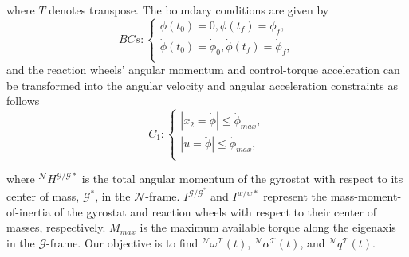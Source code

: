 \documentclass[letterpaper, paper,12pt]{AAS}		%
\begin{document}
	where $T$ denotes transpose. The boundary conditions are given by
	\begin{equation}\label{Bcs}
	BCs:\left\{
	\begin{array}{l}
	\phi(t_0)=0, \phi(t_f)=\phi_{f},\\
	\dot{\phi}(t_0)=\dot{\phi}_{0},\dot{ \phi}(t_f)=\dot{\phi}_{f}, \\
	\end{array}
	\right.
	\end{equation}
	and the reaction wheels' angular momentum and control-torque acceleration can be transformed into the angular velocity and angular acceleration constraints as follows
	\begin{equation}\label{constraints1}
	C_1:\left\{
	\begin{array}{l}
	|x_2=\dot{\phi}|\leq \dot{\phi}_{max},\\
	|u=\ddot{\phi}|\leq \ddot{\phi}_{max},\\
	\end{array}
	\right.
	\end{equation}
	
	
	
where $^\mathcal{N}H^{\mathcal{G/G*}}$ is the total angular momentum of the gyrostat with respect to its center of mass, $\mathcal{G}^*$, in the $\mathcal{N}$-frame. $I^{\mathcal{G/G^*}}$ and $I^{w/w*}$ represent the mass-moment-of-inertia of the gyrostat and reaction wheels with respect to their center of masses, respectively. $M_{max}$ is the maximum available torque along the eigenaxis in the $\mathcal{G}$-frame. Our objective is to find $^\mathcal{N}\omega^\mathcal{T}(t)$, $^\mathcal{N}\alpha^\mathcal{T}(t)$, and $^\mathcal{N}q^\mathcal{T}(t)$.\\
	
	
\end{document}
